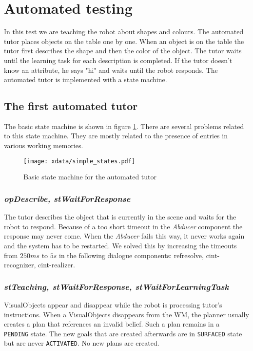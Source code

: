 \documentclass{article}
\begin{document}
\section{Automated testing}

In this test we are teaching the robot about shapes and colours. The automated
tutor places objects on the table one by one. When an object is on the table
the tutor first describes the shape and then the color of the object. The tutor
waits until the learning task for each description is completed. If the tutor
doesn't know an attribute, he says "hi" and waits until the robot responds.
The automated tutor is implemented with a state machine. 

\subsection{The first automated tutor}

The basic state machine is shown in figure \ref{fig:simpleStates}. There are
several problems related to this state machine. They are mostly related to the
presence of entries in various working memories.

\begin{figure}
\texttt{[image: xdata/simple\_states.pdf]}
\label{fig:simpleStates}
\caption{Basic state machine for the automated tutor}
\end{figure}

\subsubsection*{\em opDescribe, stWaitForResponse }

The tutor describes the object that is currently in the scene and waits for the
robot to respond. Because of a too short timeout in the {\em Abducer} component
the response may never come. When the {\em Abducer} fails this way, it never
works again and the system has to be restarted. We solved this by increasing
the timeouts from $250ms$ to $5s$ in the following dialogue components:
refresolve, cint-recognizer, cint-realizer.

\subsubsection*{\em stTeaching, stWaitForResponse, stWaitForLearningTask}

VisualObjects appear and disappear while the robot is processing tutor's
instructions. When a VisualObjects disappears from the WM, the planner usually
creates a plan that references an invalid belief. Such a plan remains in a {\tt
PENDING} state. The new goals that are created afterwards are in {\tt SURFACED}
state but are never {\tt ACTIVATED}. No new plans are created.
\end{document}
